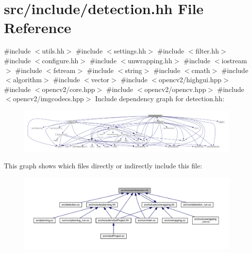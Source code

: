 \hypertarget{detection_8hh}{}\section{src/include/detection.hh File Reference}
\label{detection_8hh}
{\ttfamily \#include $<$utils.\+hh$>$}\newline
{\ttfamily \#include $<$settings.\+hh$>$}\newline
{\ttfamily \#include $<$filter.\+hh$>$}\newline
{\ttfamily \#include $<$configure.\+hh$>$}\newline
{\ttfamily \#include $<$unwrapping.\+hh$>$}\newline
{\ttfamily \#include $<$iostream$>$}\newline
{\ttfamily \#include $<$fstream$>$}\newline
{\ttfamily \#include $<$string$>$}\newline
{\ttfamily \#include $<$cmath$>$}\newline
{\ttfamily \#include $<$algorithm$>$}\newline
{\ttfamily \#include $<$vector$>$}\newline
{\ttfamily \#include $<$opencv2/highgui.\+hpp$>$}\newline
{\ttfamily \#include $<$opencv2/core.\+hpp$>$}\newline
{\ttfamily \#include $<$opencv2/opencv.\+hpp$>$}\newline
{\ttfamily \#include $<$opencv2/imgcodecs.\+hpp$>$}\newline
Include dependency graph for detection.\+hh\+:
\nopagebreak
\begin{figure}[H]
\begin{center}
\leavevmode
\includegraphics[width=350pt]{detection_8hh__incl}
\end{center}
\end{figure}
This graph shows which files directly or indirectly include this file\+:
\nopagebreak
\begin{figure}[H]
\begin{center}
\leavevmode
\includegraphics[width=350pt]{detection_8hh__dep__incl}
\end{center}
\end{figure}
